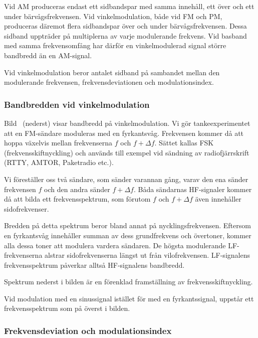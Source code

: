Vid AM produceras endast ett sidbandspar med samma innehåll, ett över och ett
under bärvågsfrekvensen.
Vid vinkelmodulation, både vid FM och PM, produceras däremot flera sidbandspar
över och under bärvågsfrekvensen.
Dessa sidband uppträder på multiplerna av varje modulerande frekvens.
Vid basband med samma frekvensomfång har därför en vinkelmodulerad signal
större bandbredd än en AM-signal.

Vid vinkelmodulation beror antalet sidband på sambandet mellan den modulerande
frekvensen, frekvensdeviationen och modulationsindex.


\subsubsection{Bandbredden vid vinkelmodulation}

Bild~ (nederst) visar bandbredd på vinkelmodulation.
Vi gör tankeexperimentet att en FM-sändare moduleras med en fyrkantsvåg.
Frekvensen kommer då att hoppa växelvis mellan frekvenserna \(f\) och
\(f + \Delta f\).
Sättet kallas FSK (frekvensskiftnyckling) och används till exempel vid sändning
av radiofjärrskrift (RTTY, AMTOR, Paketradio etc.).

Vi föreställer oss två sändare, som sänder varannan gång, varav den ena sänder
frekvensen \(f\) och den andra sänder \(f + \Delta f\).
Båda sändarnas HF-signaler kommer då att bilda ett frekvensspektrum, som
förutom \(f\) och \(f + \Delta f\) även innehåller sidofrekvenser.

Bredden på detta spektrum beror bland annat på nycklingsfrekvensen.
Eftersom en fyrkantsvåg innehåller summan av dess grundfrekvens och övertoner,
kommer alla dessa toner att modulera vardera sändaren.
De högsta modulerande LF-frekvenserna alstrar sidofrekvenserna längst ut från
vilofrekvensen.
LF-signalens frekvensspektrum påverkar alltså HF-signalens bandbredd.

Spektrum nederst i bilden är en förenklad framställning av
frekvensskiftnyckling.

Vid modulation med en sinussignal istället för med en fyrkantssignal, uppstår
ett frekvensspektrum som på överst i bilden.

\subsubsection{Frekvensdeviation och modulationsindex}

